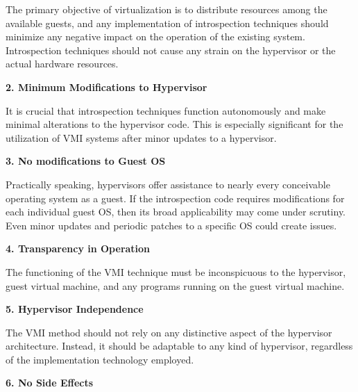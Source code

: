 \documentclass{report}
\begin{document}
\begin{spacing}{1.5}
{\large
\noindent The primary objective of virtualization is to distribute resources among the available guests, and any implementation of introspection techniques should minimize any negative impact on the operation of the existing system. Introspection techniques should not cause any strain on the hypervisor or the actual hardware resources.
\leavevmode\newline
}



{\large
\noindent \textbf{2. Minimum Modifications to Hypervisor}
\leavevmode\newline
}

{\large
\noindent It is crucial that introspection techniques function autonomously and make minimal alterations to the hypervisor code. This is especially significant for the utilization of VMI systems after minor updates to a hypervisor.  
\newline
}


{\large
\noindent \textbf{3. No modifications to Guest OS}
\leavevmode\newline
}

{\large
\noindent Practically speaking, hypervisors offer assistance to nearly every conceivable operating system as a guest. If the introspection code requires modifications for each individual guest OS, then its broad applicability may come under scrutiny. Even minor updates and periodic patches to a specific OS could create issues.
\newline
}

    
{\large
\noindent \textbf{4. Transparency in Operation}
\leavevmode\newline
}

{\large
\noindent The functioning of the VMI technique must be inconspicuous to the hypervisor, guest virtual machine, and any programs running on the guest virtual machine.
\newline
}


{\large
\noindent \textbf{5. Hypervisor Independence}
\leavevmode\newline
}

{\large
\noindent The VMI method should not rely on any distinctive aspect of the hypervisor architecture. Instead, it should be adaptable to any kind of hypervisor, regardless of the implementation technology employed.
\newline
}


{\large
\noindent \textbf{6. No Side Effects}
\leavevmode\newline
}


\end{spacing}
\end{document}
